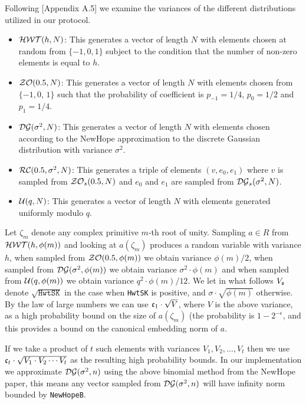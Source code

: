 Following \cite{GHS12c}[Appendix A.5] we examine the variances
of the different distributions utilized in our protocol.
\begin{itemize}
\item $\mathcal{HWT}(h,N)$: This generates a vector of length $N$
      with elements chosen at random from $\{-1,0,1\}$ subject to
      the condition that the number of non-zero elements is equal to $h$.
\item $\mathcal{ZO}(0.5,N)$:  This generates a vector of length $N$
      with elements chosen from $\{-1,0$, $1\}$ such that the
      probability of coefficient is $p_{-1}=1/4$, $p_0=1/2$
      and $p_1=1/4$.
\item $\mathcal{DG}(\sigma^2,N)$: This generates a vector of
      length $N$ with elements chosen according to the NewHope 
      approximation to the discrete Gaussian distribution with variance $\sigma^2$.
\item $\mathcal{RC}(0.5,\sigma^2,N)$: This generates a triple of
      elements $(v,e_0,e_1)$ where $v$ is sampled from $\mathcal{ZO}_s(0.5,N)$
      and $e_0$ and $e_1$ are sampled from $\mathcal{DG}_s(\sigma^2,N)$.
\item $\mathcal{U}(q,N)$: This generates a vector of length $N$ 
      with elements generated uniformly modulo $q$.
\end{itemize}
Let $\zeta_m$ denote any complex primitive $m$-th root of unity.
Sampling $a \in R$ from $\mathcal{HWT}(h,\phi(m))$ and looking at $a(\zeta_m)$
produces a random variable with variance $h$, when sampled
from $\mathcal{ZO}(0.5,\phi(m))$ we obtain variance $\phi(m)/2$,
when sampled from $\mathcal{DG}(\sigma^2,\phi(m))$ we obtain variance
$\sigma^2 \cdot \phi(m)$ and when sampled from $\mathcal{U}(q,\phi(m))$
we obtain variance $q^2 \cdot \phi(m)/12$.
We let in what follows $V_{\mathfrak{s}}$ denote $\sqrt{\texttt{HwtSK}}$ in the case 
when \verb|HwtSK| is positive, and $\sigma \cdot \sqrt{\phi(m)}$ otherwise.
By the law of large numbers we can use $\mathfrak{c}_1 \cdot \sqrt{V}$,
where $V$ is the above variance, as a high probability bound
on the size of $a(\zeta_m)$ (the probability is $1-2^{-\epsilon}$, 
and this provides a bound on the canonical embedding norm of $a$.

If we take a product of $t$ such
elements with variances $V_1, V_2, \ldots, V_t$
then we use $\mathfrak{c}_t \cdot \sqrt{V_1 \cdot V_2 \cdots V_t}$
as the resulting high probability bounds.
In our implementation we approximate $\mathcal{DG}(\sigma^2,n)$ using
the above binomial method from the NewHope paper, this means
any vector sampled from $\mathcal{DG}(\sigma^2,n)$ will have
infinity norm bounded by \verb+NewHopeB+.



